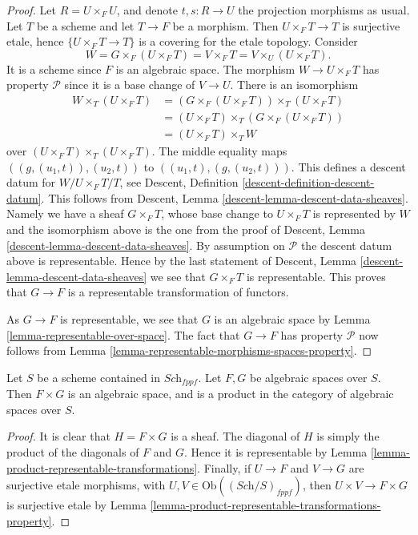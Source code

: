 \begin{proof}
Let $R = U \times_F U$, and denote $t, s : R \to U$ the projection morphisms
as usual. Let $T$ be a scheme and let $T \to F$ be a morphism. Then
$U \times_F T \to T$ is surjective etale, hence $\{U \times_F T \to T\}$ is
a covering for the etale topology. Consider
$$
W = G \times_F (U \times_F T) = V \times_F T = V \times_U (U \times_F T).
$$
It is a scheme since $F$ is an algebraic space. The morphism
$W \to U \times_F T$ has property $\mathcal{P}$ since it is a
base change of $V \to U$. There is an isomorphism
\begin{align*}
W \times_T (U \times_F T) & = 
(G \times_F (U \times_F T)) \times_T (U \times_F T) \\
& = (U \times_F T) \times_T (G \times_F (U \times_F T)) \\
& = (U \times_F T) \times_T W
\end{align*}
over $(U \times_F T) \times_T (U \times_F T)$. The middle equality maps
$((g, (u_1, t)), (u_2, t))$ to $((u_1, t), (g, (u_2, t)))$.
This defines a descent datum for $W/U \times_F T/T$, see
Descent, Definition \ref{descent-definition-descent-datum}.
This follows from
Descent, Lemma \ref{descent-lemma-descent-data-sheaves}.
Namely we have a sheaf $G \times_F T$, whose
base change to $U \times_F T$ is represented by $W$ and the isomorphism
above is the one from the proof of
Descent, Lemma \ref{descent-lemma-descent-data-sheaves}.
By assumption on $\mathcal{P}$ the descent datum above is representable.
Hence by the last statement of
Descent, Lemma \ref{descent-lemma-descent-data-sheaves}
we see that $G \times_F T$ is representable. This proves that
$G \to F$ is a representable transformation of functors.

\medskip\noindent
As $G \to F$ is representable, we see that $G$ is an algebraic space by
Lemma \ref{lemma-representable-over-space}. The fact that $G \to F$ has
property $\mathcal{P}$ now follows from
Lemma \ref{lemma-representable-morphisms-spaces-property}.
\end{proof}

\begin{lemma}
\label{lemma-product-spaces}
Let $S$ be a scheme contained in $\textit{Sch}_{fppf}$.
Let $F, G$ be algebraic spaces over $S$.
Then $F \times G$ is an algebraic space, and is a product
in the category of algebraic spaces over $S$.
\end{lemma}

\begin{proof}
It is clear that $H = F \times G$ is a sheaf.
The diagonal of $H$ is simply the product of the
diagonals of $F$ and $G$. Hence it is representable by
Lemma \ref{lemma-product-representable-transformations}.
Finally, if $U \to F$ and $V \to G$ are surjective
etale morphisms, with $U, V \in \text{Ob}((\textit{Sch}/S)_{fppf})$,
then $U \times V \to F \times G$ is surjective etale
by Lemma \ref{lemma-product-representable-transformations-property}.
\end{proof}

